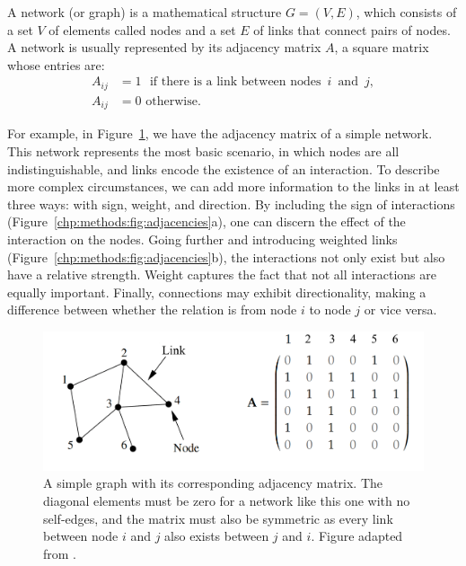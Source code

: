  A network (or graph) is a mathematical structure 
 $G = (V, E)$, which consists of a set $V$ of elements called nodes and a set $E$ of links that connect pairs of nodes. A network is usually represented by its adjacency matrix $A$, a square matrix whose entries are:
 \begin{align*}
       A_{ij} &= 1 \, \,  \textrm{ if there is a link between nodes } \, i \, \textrm{ and } \, j , \\
       A_{ij} &= 0 \, \, \textrm{otherwise}.
 \end{align*}

For example, in Figure~\ref{fig:simpleNetwork}, we have the adjacency matrix of a simple network. This network represents the most basic scenario, in which nodes are all indistinguishable, and links  encode the existence of an interaction. To describe more complex circumstances, we can add more information to the links in at least three ways: with sign, weight, and direction. By including the sign of interactions (Figure~\ref{chp:methods:fig:adjacencies}a), one can discern the effect of the interaction on the nodes. Going further and introducing weighted links (Figure~\ref{chp:methods:fig:adjacencies}b), the interactions not only exist but also have a relative strength. Weight captures the fact that not all interactions are equally important. Finally, connections may exhibit directionality, making a difference between whether the relation is from node $i$ to node $j$ or vice versa.\\

\begin{figure}[h]
    \centering
    \includegraphics[width= 0.8\columnwidth]{figures/methods/fig_simpleNetwork.png}
    \caption[A simple graph]{A simple graph with its corresponding adjacency matrix. The diagonal elements must be zero for a network like this one with no self-edges, and the matrix must also be symmetric as every link between node $i$ and $j$ also exists between $j$ and $i$. Figure adapted from \cite{Newman2010}.}
    \label{fig:simpleNetwork}
\end{figure}

